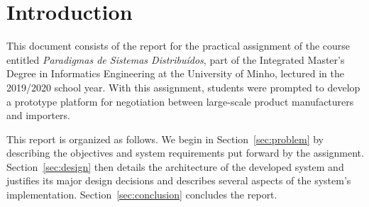
\section{Introduction}
\label{sec:introduction}

This document consists of the report for the practical assignment of the course entitled \emph{Paradigmas de Sistemas Distribuídos}, part of the Integrated Master's Degree in Informatics Engineering at the University of Minho, lectured in the 2019/2020 school year.
With this assignment, students were prompted to develop a prototype platform for negotiation between large-scale product manufacturers and importers.

This report is organized as follows. We begin in Section~\ref{sec:problem} by describing the objectives and system requirements put forward by the assignment.
Section~\ref{sec:design} then details the architecture of the developed system and justifies its major design decisions and describes several aspects of the system's implementation.
Section~\ref{sec:conclusion} concludes the report.

